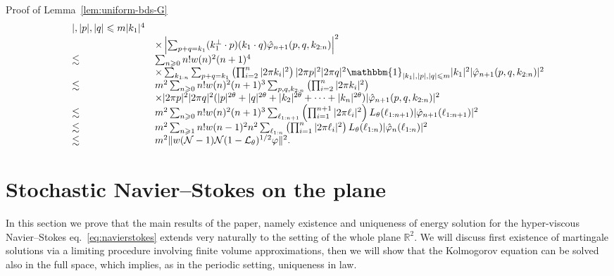 \documentclass[10pt]{article}
\newenvironment{proof*}[1]{\noindent\textbf{#1\ }}{\hspace*{\fill}$\Box$\medskip}
\begin{document}
\begin{proof*}{Proof of Lemma~\ref{lem:uniform-bds-G}}
\[\begin{array}{ll}
{{       |, | p |, | q | \leqslant m}}{| k_1 |^4}\\
       & \times \left| \sum_{p + q = k_1} (k_1^{\perp} \cdot p)  (k_1 \cdot
       q) \hat{\varphi}_{n + 1} (p, q, k_{2 : n}) \right|^2\\
       \lesssim & \sum_{n \geqslant 0} n! w (n)^2 (n + 1)^4\\
       & \times \sum_{k_{1 : n}} \sum_{p + q = k_1} \left( \prod_{i = 2}^n |
       2 \pi k_i |^2 \right) | 2 \pi p |^2 | 2 \pi q |^2 \mathbbm{1}_{| k_1 |,
       | p |, | q | \leqslant m} | k_1 |^2 | \hat{\varphi}_{n + 1} (p, q, k_{2
       : n}) |^2\\
       \lesssim & m^2 \sum_{n \geqslant 0} n! w (n)^2 (n + 1)^3 \sum_{p, q,
       k_{2 : n}} \left( \prod_{i = 2}^n | 2 \pi k_i |^2 \right)\\
       & \times | 2 \pi p |^2 | 2 \pi q |^2 (| p |^{2 \theta} + | q |^{2
       \theta} + | k_2 |^{2 \theta} + \cdots + | k_n |^{2 \theta}) |
       \hat{\varphi}_{n + 1} (p, q, k_{2 : n}) |^2\\
       \lesssim & m^2 \sum_{n \geqslant 0} n! w (n)^2 (n + 1)^3 \sum_{\ell_{1
       : n + 1}} \left( \prod_{i = 1}^{n + 1} | 2 \pi \ell_i |^2 \right)
       L_{\theta} (\ell_{1 : n + 1}) | \hat{\varphi}_{n + 1} (\ell_{1 : n +
       1}) |^2\\
       \lesssim & m^2 \sum_{n \geqslant 1} n! w (n - 1)^2 n^2 \sum_{\ell_{1 :
       n}} \left( \prod_{i = 1}^n | 2 \pi \ell_i |^2 \right) L_{\theta}
       (\ell_{1 : n}) | \hat{\varphi}_n (\ell_{1 : n}) |^2\\
       \lesssim & m^2 \| w (\mathcal{N}- 1) \mathcal{N} (1
       -\mathcal{L}_{\theta})^{1 / 2} \varphi \|^2 .
     \end{array} \]
  
\end{proof*}

\section{Stochastic Navier--Stokes on the plane}\label{s:whole-space}

In this section we prove that the main results of the paper, namely existence
and uniqueness of energy solution for the hyper-viscous Navier--Stokes
eq.~{\eqref{eq:navierstokes}} extends very naturally to the setting of the
whole plane $\mathbb{R}^2$. We will discuss first existence of martingale
solutions via a limiting procedure involving finite volume approximations,
then we will show that the Kolmogorov equation can be solved also in the full
space, which implies, as in the periodic setting, uniqueness in law.
\end{document}

